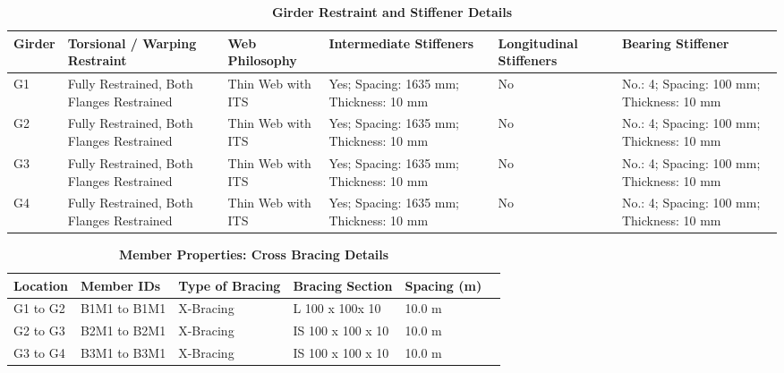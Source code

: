\documentclass[12pt,a4paper]{report}
\numberwithin{table}{chapter}
\numberwithin{figure}{chapter}
\begin{document}
\vspace{4pt}
\begin{longtable}{|L{1.4cm}|p{2.2cm}|p{2.2cm}|p{3.0cm}|p{2.4cm}|p{2.2cm}|}
\caption{\textbf{Girder Restraint and Stiffener Details}}\\
\hline
\textbf{Girder} & \textbf{Torsional / Warping Restraint} & \textbf{Web Philosophy} & \textbf{Intermediate Stiffeners} & \textbf{Longitudinal Stiffeners} & \textbf{Bearing Stiffener} \\[6pt]
\hline
\endfirsthead
\endhead

G1 & Fully Restrained, Both Flanges Restrained & Thin Web with ITS & Yes; Spacing: 1635 mm; Thickness: 10 mm & No & No.: 4; Spacing: 100 mm; Thickness: 10 mm \\[8pt]
\hline
G2 & Fully Restrained, Both Flanges Restrained & Thin Web with ITS & Yes; Spacing: 1635 mm; Thickness: 10 mm & No & No.: 4; Spacing: 100 mm; Thickness: 10 mm \\[8pt]
\hline
G3 & Fully Restrained, Both Flanges Restrained & Thin Web with ITS & Yes; Spacing: 1635 mm; Thickness: 10 mm & No & No.: 4; Spacing: 100 mm; Thickness: 10 mm \\[8pt]
\hline
G4 & Fully Restrained, Both Flanges Restrained & Thin Web with ITS & Yes; Spacing: 1635 mm; Thickness: 10 mm & No & No.: 4; Spacing: 100 mm; Thickness: 10 mm \\[8pt]
\hline
\end{longtable}



\newpage

\vspace{0.4em}
\setlength{\tabcolsep}{4pt}
\setlength\LTleft{0pt}
\setlength\LTright{\fill}

\begin{longtable}{|L{2.2cm}|L{2.2cm}|L{3.0cm}|L{2.5cm}|C{1.8cm}|C{1.8cm}|}
\caption{\textbf{Member Properties: Cross Bracing Details}}
\hline
\textbf{Location} & \textbf{Member IDs} & \textbf{Type of Bracing} & \textbf{Bracing Section} & \textbf{Spacing (m)} \\
\hline
G1 to G2 & B1M1 to B1M1 & X-Bracing & L 100 x 100x 10 & 10.0 m \\[6pt]
\hline
G2 to G3 & B2M1 to B2M1 & X-Bracing & IS 100 x 100 x 10 & 10.0 m \\[6pt]
\hline
G3 to G4 & B3M1 to B3M1 & X-Bracing & IS 100 x 100 x 10 & 10.0 m \\[6pt]
\hline
\end{longtable}

\vspace{0.4em}
\noindent
\setlength{\tabcolsep}{4pt}
\setlength\LTleft{0pt}
\setlength\LTright{\fill}
\end{document}
